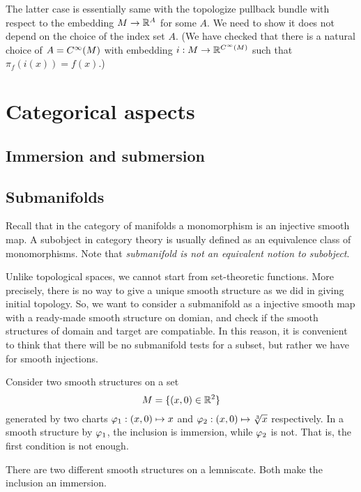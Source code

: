 \documentclass{../exp}
\begin{document}
The latter case is essentially same with the topologize pullback bundle with respect to the embedding $M\to\R^A$ for some $A$.
We need to show it does not depend on the choice of the index set $A$.
(We have checked that there is a natural choice of $A=C^\infty(M)$ with embedding $i:M\to\R^{C^\oo(M)}$ such that $\pi_f(i(x))=f(x)$.)










\section{Categorical aspects}

\subsection{Immersion and submersion}

\subsection{Submanifolds}

Recall that in the category of manifolds a monomorphism is an injective smooth map.
A subobject in category theory is usually defined as an equivalence class of monomorphisms.
Note that \emph{submanifold is not an equivalent notion to subobject}.





Unlike topological spaces, we cannot start from set-theoretic functions.
More precisely, there is no way to give a unique smooth structure as we did in giving initial topology.
So, we want to consider a submanifold as a injective smooth map with a ready-made smooth structure on domian, and check if the smooth structures of domain and target are compatiable.
In this reason, it is convenient to think that there will be no submanifold tests for a subset, but rather we have for smooth injections.
\begin{ex}
Consider two smooth structures on a set
\[M=\{(x,0)\in\mathbb{R}^2\}\]
generated by two charts $\varphi_1:(x,0)\mapsto x$ and $\varphi_2:(x,0)\mapsto\sqrt[3]{x}$ respectively.
In a smooth structure by $\varphi_1$, the inclusion is immersion, while $\varphi_2$ is not.
That is, the first condition is not enough.
\end{ex}
\begin{ex}
There are two different smooth structures on a lemniscate.
Both make the inclusion an immersion.
\end{ex}
\end{document}
